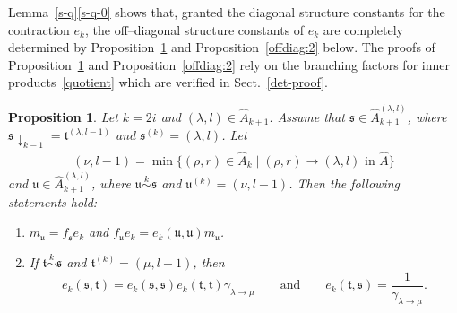 \documentclass[11pt,a4paper,reqno,svgnames]{amsart}
\theoremstyle{plain}
\newtheorem{proposition}[theorem]{Proposition}
\theoremstyle{definition}
\numberwithin{equation}{section}
\begin{document}
Lemma~\ref{s-q}\eqref{s-q-0} shows that, granted the diagonal structure constants for the contraction $e_k$, the off--diagonal structure constants of $e_k$ are completely determined by Proposition~\ref{offdiag:1} and Proposition~\ref{offdiag:2} below. The proofs of Proposition~\ref{offdiag:1} and Proposition~\ref{offdiag:2} rely on the branching factors for inner products~\eqref{quotient} which are verified in Sect.~\ref{det-proof}.
\begin{proposition}\label{offdiag:1}
Let $k=2i$ and $(\lambda,l)\in\hat{A}_{k+1}$. Assume that $\mathfrak{s}\in\hat{A}_{k+1}^{(\lambda,l)}$, where $\mathfrak{s}\downarrow_{k-1}=\mathfrak{t}^{(\lambda,l-1)}$ and $\mathfrak{s}^{(k)}=(\lambda,l)$. Let 
\begin{align*}
(\nu,l-1)=\min\lbrace(\rho,r)\in\hat{A}_k\mid(\rho,r)\to(\lambda,l)\text{ in }\hat{A}\rbrace
\end{align*}
and $\mathfrak{u}\in\hat{A}_{k+1}^{(\lambda,l)}$, where $\mathfrak{u}\stackrel{k}{\sim}\mathfrak{s}$ and $\mathfrak{u}^{(k)}=(\nu,l-1)$. Then the following statements hold:
\begin{enumerate}[label=(\arabic{*}), ref=\arabic{*},leftmargin=0pt,itemindent=1.5em]
\item\label{offdiag:1.1} $m_\mathfrak{u}=f_\mathfrak{s}e_k$ and $f_\mathfrak{u}e_k=e_k(\mathfrak{u,u})m_\mathfrak{u}$. 
\item\label{offdiag:1.2} If $\mathfrak{t}\stackrel{k}{\sim}\mathfrak{s}$ and $\mathfrak{t}^{(k)}=(\mu,l-1)$, then  
\[
e_k(\mathfrak{s,t})=e_k( \mathfrak{s,s})e_k(\mathfrak{t,t}) \gamma_{\lambda\to\mu}\qquad\text{and}\qquad e_k(\mathfrak{t,s})=\frac{1}{\gamma_{\lambda\to\mu}}. 
\]
\end{enumerate}
\end{proposition}
\end{document}
